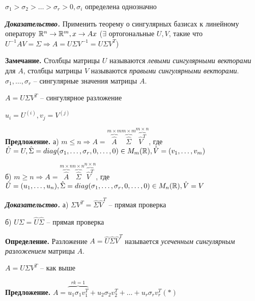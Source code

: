 $\sigma_1 > \sigma_2 > \dots > \sigma_r > 0, \sigma_i$ определена однозначно

\vspace{\baselineskip}
\textbf{\textit{Доказательство.}} Применить теорему о сингулярных базисах к линейному оператору $\mathbb{R}^n \rightarrow \mathbb{R}^m, x \rightarrow Ax$ ($\exists$ ортогональные $U, V$, такие что $U^{-1} A V = \Sigma \Rightarrow A = U \Sigma V^{-1} = U \Sigma V^T$)

\vspace{\baselineskip}
\textbf{Замечание.} Столбцы матрицы $U$ называются \textit{левыми сингулярными векторами} для $A$, столбцы матрицы $V$ называются \textit{правыми сингулярными векторами}. $\sigma_1, \dots, \sigma_r$ -- сингулярные значения матрицы $A$.

\vspace{\baselineskip}
$A = U \Sigma V^T$ -- сингулярное разложение

$u_i = U^{(i)}, v_j = V^{(j)}$

\vspace{\baselineskip}
\textbf{Предложение.} а) $m \leqslant n \Rightarrow A = \overbrace{\hat{A}}^{m \times m} \overbrace{\hat{\Sigma}}^{m \times m} \overbrace{\hat{V}^T}^{m \times n}$, где $\hat{U} = U, \hat{\Sigma} = diag(\sigma_1, \dots, \sigma_r, 0, \dots, 0) \in M_m(\mathbb{R}), \hat{V} = (v_1, \dots, v_m)$

б) $m \geqslant n \Rightarrow A = \overbrace{\hat{A}}^{m \times n} \overbrace{\hat{\Sigma}}^{n \times n} \overbrace{\hat{V}^T}^{n \times n}$, где $\hat{U} = (u_1, \dots, u_n), \hat{\Sigma} = diag(\sigma_1, \dots, \sigma_r, 0, \dots, 0) \in M_n(\mathbb{R}), \hat{V} = V$

\vspace{\baselineskip}
\textbf{\textit{Доказательство.}} а) $\Sigma V^T = \hat{\Sigma} \hat{V}^T$ -- прямая проверка

б) $U \Sigma = \hat{U }\hat{\Sigma}$ -- прямая проверка

\vspace{\baselineskip}
\textbf{Определение.} Разложение $A = \hat{U} \hat{\Sigma} \hat{V}^T$ называется \textit{усеченным сингулярным разложением} матрицы $A$.

\vspace{\baselineskip}
$A = U \Sigma V^T$ -- как выше

\vspace{\baselineskip}
\textbf{Предложение.} $A = \overbrace{u_1 \sigma_1 v_1^T}^{rk = 1} + u_2 \sigma_2 v_2^T + \dots + u_r \sigma_r v_r^T (*)$

